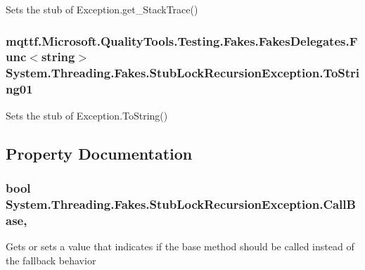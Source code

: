 Sets the stub of Exception.\-get\-\_\-\-Stack\-Trace()

\hypertarget{class_system_1_1_threading_1_1_fakes_1_1_stub_lock_recursion_exception_a3cde1a72448b1d3f854ec9e10590a886}{
\subsubsection[{To\-String01}]{\setlength{\rightskip}{0pt plus 5cm}mqttf.\-Microsoft.\-Quality\-Tools.\-Testing.\-Fakes.\-Fakes\-Delegates.\-Func$<$string$>$ System.\-Threading.\-Fakes.\-Stub\-Lock\-Recursion\-Exception.\-To\-String01}}\label{class_system_1_1_threading_1_1_fakes_1_1_stub_lock_recursion_exception_a3cde1a72448b1d3f854ec9e10590a886}


Sets the stub of Exception.\-To\-String()



\subsection{Property Documentation}
\hypertarget{class_system_1_1_threading_1_1_fakes_1_1_stub_lock_recursion_exception_a15a638cbc328bb7f09424400a8b9165d}{
\subsubsection[{Call\-Base}]{\setlength{\rightskip}{0pt plus 5cm}bool System.\-Threading.\-Fakes.\-Stub\-Lock\-Recursion\-Exception.\-Call\-Base\hspace{0.3cm}{\ttfamily [get]}, {\ttfamily [set]}}}\label{class_system_1_1_threading_1_1_fakes_1_1_stub_lock_recursion_exception_a15a638cbc328bb7f09424400a8b9165d}


Gets or sets a value that indicates if the base method should be called instead of the fallback behavior

